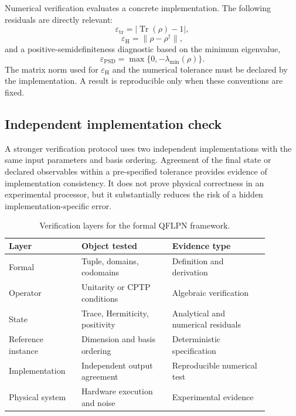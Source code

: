 \documentclass[final,3p,times]{elsarticle}
\begin{document}
Numerical verification evaluates a concrete implementation. The following residuals are directly relevant:
\begin{equation}
    \varepsilon_{\mathrm{tr}}=|\operatorname{Tr}(\rho)-1|,
\end{equation}
\begin{equation}
    \varepsilon_{\mathrm{H}}=\|\rho-\rho^\dagger\|,
\end{equation}
and a positive-semidefiniteness diagnostic based on the minimum eigenvalue,
\begin{equation}
    \varepsilon_{\mathrm{PSD}}=\max\{0,-\lambda_{\min}(\rho)\}.
\end{equation}
The matrix norm used for $\varepsilon_{\mathrm{H}}$ and the numerical tolerance must be declared by the implementation. A result is reproducible only when these conventions are fixed.

\subsection{Independent implementation check}

A stronger verification protocol uses two independent implementations with the same input parameters and basis ordering. Agreement of the final state or declared observables within a pre-specified tolerance provides evidence of implementation consistency. It does not prove physical correctness in an experimental processor, but it substantially reduces the risk of a hidden implementation-specific error.

\begin{table}[tbp]
    \centering
    \caption{Verification layers for the formal QFLPN framework.}
    \label{tab:verification}
\begin{tabular}{p{0.24\linewidth} p{0.31\linewidth} p{0.33\linewidth}}
        \toprule
        Layer              & Object tested                  & Evidence type                      \\
        \midrule
        Formal             & Tuple, domains, codomains      & Definition and derivation          \\
        Operator           & Unitarity or CPTP conditions   & Algebraic verification             \\
        State              & Trace, Hermiticity, positivity & Analytical and numerical residuals \\
        Reference instance & Dimension and basis ordering   & Deterministic specification        \\
        Implementation     & Independent output agreement   & Reproducible numerical test        \\
        Physical system    & Hardware execution and noise   & Experimental evidence              \\
        \bottomrule
\end{tabular}
\end{table}
\end{document}
